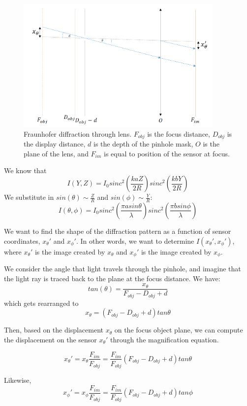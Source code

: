 \begin{figure}[ht]
  \centering
  \includegraphics[width=4in]{chapters/chapter8/images/Lens_Diffraction.png}
  \caption{Fraunhofer diffraction through lens. $F_{obj}$ is the focus distance, $D_{obj}$ is the display distance, $d$ is the depth of the pinhole mask, $O$ is the plane of the lens, and $F_{im}$ is equal to position of the sensor at focus.}
  \label{fig:ferrari}
\end{figure}

We know that $$I(Y,Z) = I_0  sinc^2\left(\frac{kaZ}{2R}\right) sinc^2\left(\frac{kbY}{2R}\right)$$
We substitute in $sin(\theta) \sim \frac{Z}{R}$ and $sin(\phi) \sim \frac{Y}{R}$:
$$I(\theta,\phi) = I_0  sinc^2\left(\frac{\pi a sin \theta}{\lambda}\right) sinc^2 \left(\frac{\pi b sin \phi}{\lambda}\right)$$

We want to find the shape of the diffraction pattern as a function of sensor coordinates, $x_{\theta}'$ and $x_{\phi}'$. In other words, we want to determine $I(x_{\theta}', x_{\phi}')$, where $x_{\theta}'$ is the image created by $x_{\theta}$ and $x_{\phi}'$ is the image created by $x_{\phi}$. 

We consider the angle that light travels through the pinhole, and imagine that the light ray is traced back to the plane at the focus distance. We have: 
$$tan(\theta) = \frac{x_{\theta}}{F_{obj} - D_{obj} + d}$$ 
which gets rearranged to 
$$x_{\theta} = (F_{obj} - D_{obj} + d) tan\theta$$

Then, based on the displacement $x_{\theta}$ on the focus object plane, we can compute the displacement on the sensor $x_{\theta}'$ through the magnification equation. 

$$x_{\theta}' = x_{\theta} \frac{F_{im}}{F_{obj}} =  \frac{F_{im}}{F_{obj}} (F_{obj} - D_{obj} + d) tan\theta $$

Likewise, $$x_{\phi}' = x_{\phi} \frac{F_{im}}{F_{obj}} =  \frac{F_{im}}{F_{obj}} (F_{obj} - D_{obj} + d) tan\phi $$

